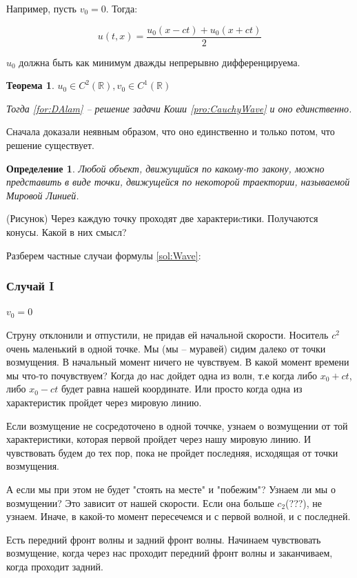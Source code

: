 \documentclass[12pt]{report}
\newtheorem{definition}{Определение}
\newtheorem{theorem}{Теорема}
\begin{document}
 Например, пусть $v_0 = 0$. Тогда: 
 
 $$
    u(t,x) = \frac{u_0(x - ct) + u_0(x + ct)}{2}
 $$

$u_0$ должна быть как минимум дважды непрерывно дифференцируема. 

\begin{theorem}
    $u_0 \in C^2(\mathbb{R}), v_0 \in C^1(\mathbb{R})$
    
    Тогда \eqref{for:DAlam} -- решение задачи Коши \ref{pro:CauchyWave} и оно единственно.
\end{theorem}

Сначала доказали неявным образом, что оно единственно и только потом, что решение существует. 

\begin{definition}
    Любой объект, движущийся по какому-то закону, можно представить в виде точки, движущейся по некоторой траектории, называемой Мировой Линией. 
\end{definition}

(Рисунок) Через каждую точку проходят две характериcтики. Получаются конусы. Какой в них смысл? 

Разберем частные случаи формулы \ref{sol:Wave}: 

\subsubsection{Случай I}
$v_0 = 0$

Струну отклонили и отпустили, не придав ей начальной скорости. Носитель $c^2$ очень маленький в одной точке. Мы (мы -- муравей) сидим далеко от точки возмущения. В начальный момент ничего не чувствуем. В какой момент времени мы что-то почувствуем? Когда до нас дойдет одна из волн, т.е когда либо $x_0 + ct$, либо $x_0 - ct$ будет равна нашей координате. Или просто когда одна из характеристик пройдет через мировую линию. 

Если возмущение не сосредоточено в одной точчке, узнаем о возмущении от той характеристики, которая первой пройдет через нашу мировую линию. И чувствовать будем до тех пор, пока не пройдет последняя, исходящая от точки возмущения. 

А если мы при этом не будет "стоять на месте" и "побежим"? Узнаем ли мы о возмущении? Это зависит от нашей скорости. Если она больше $c_2$(???), не узнаем. Иначе, в какой-то момент пересечемся и с первой волной, и с последней. 

Есть передний фронт волны и задний фронт волны. Начинаем чувствовать возмущение, когда через нас проходит передний фронт волны и заканчиваем, когда проходит задний. 
\end{document}
